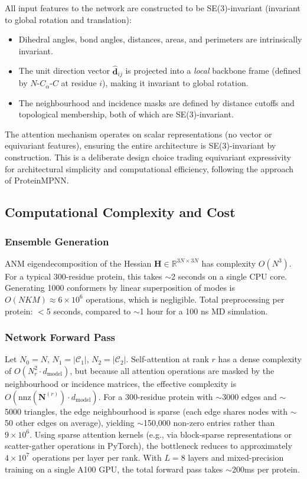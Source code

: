 \documentclass{article}
\begin{document}
All input features to the network are constructed to be SE(3)-invariant (invariant to global rotation and translation):
\begin{itemize}
    \item Dihedral angles, bond angles, distances, areas, and perimeters are intrinsically invariant.
    \item The unit direction vector $\hat{\mathbf{d}}_{ij}$ is projected into a \emph{local} backbone frame (defined by $N$-$C_\alpha$-$C$ at residue $i$), making it invariant to global rotation.
    \item The neighbourhood and incidence masks are defined by distance cutoffs and topological membership, both of which are SE(3)-invariant.
\end{itemize}
The attention mechanism operates on scalar representations (no vector or equivariant features), ensuring the entire architecture is SE(3)-invariant by construction. This is a deliberate design choice trading equivariant expressivity for architectural simplicity and computational efficiency, following the approach of ProteinMPNN.

\subsection{Computational Complexity and Cost}

\subsubsection{Ensemble Generation}
ANM eigendecomposition of the Hessian $\mathbf{H} \in \mathbb{R}^{3N \times 3N}$ has complexity $O(N^3)$. For a typical 300-residue protein, this takes $\sim$2 seconds on a single CPU core. Generating 1000 conformers by linear superposition of modes is $O(NKM) \approx 6 \times 10^6$ operations, which is negligible. Total preprocessing per protein: $<$5 seconds, compared to $\sim$1 hour for a 100 ns MD simulation.

\subsubsection{Network Forward Pass}
Let $N_0 = N$, $N_1 = |\mathcal{C}_1|$, $N_2 = |\mathcal{C}_2|$. Self-attention at rank $r$ has a dense complexity of $O(N_r^2 \cdot d_{\text{model}})$, but because all attention operations are masked by the neighbourhood or incidence matrices, the effective complexity is $O(\text{nnz}(\mathbf{N}^{(r)}) \cdot d_{\text{model}})$. For a 300-residue protein with $\sim$3000 edges and $\sim$5000 triangles, the edge neighbourhood is sparse (each edge shares nodes with $\sim$50 other edges on average), yielding $\sim$150,000 non-zero entries rather than $9 \times 10^6$. Using sparse attention kernels (e.g., via block-sparse representations or scatter-gather operations in PyTorch), the bottleneck reduces to approximately $4 \times 10^7$ operations per layer per rank. With $L = 8$ layers and mixed-precision training on a single A100 GPU, the total forward pass takes $\sim$200ms per protein.
\end{document}
